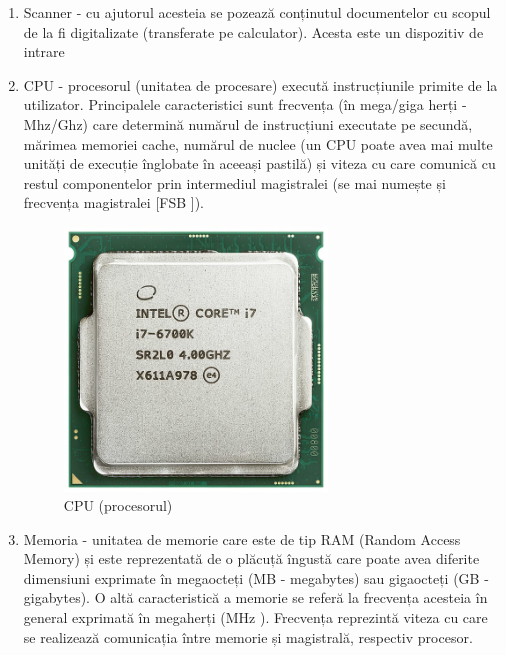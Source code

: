 
\begin{enumerate}
	\item Scanner - cu ajutorul acesteia se pozează conținutul documentelor
		cu scopul de la fi digitalizate (transferate pe calculator).
		Acesta este un dispozitiv de intrare
	\item CPU - procesorul (unitatea de procesare) execută instrucțiunile
		primite de la utilizator. Principalele caracteristici sunt
		frecvența (în mega/giga herți - Mhz/Ghz) care determină numărul
		de instrucțiuni executate pe secundă, mărimea memoriei cache,
		numărul de nuclee (un CPU poate avea mai multe unități de
		execuție înglobate în aceeași pastilă) și viteza cu care
		comunică cu restul componentelor prin intermediul magistralei
		(se mai numește și frecvența magistralei [FSB
		]).

\begin{figure}[!htbp]
	\centering
	\includegraphics[width=7cm]{chapters/08-hw/img/cpu-img.png}
	\caption{CPU (procesorul)\protect\footnotemark}
	\label{fig:hw-cpu}
\end{figure}


	\item Memoria - unitatea de memorie care este de tip RAM
		 (Random Access Memory) și
		este reprezentată de o plăcuță îngustă care poate avea diferite
		dimensiuni exprimate în megaocteți (MB  -
		megabytes) sau gigaocteți (GB  -
		gigabytes). O altă caracteristică a memorie se referă la
		frecvența acesteia în general exprimată în megaherți (MHz
		). Frecvența reprezintă viteza cu care
		se realizează comunicația între memorie și magistrală, respectiv
		procesor.


\end{enumerate}
